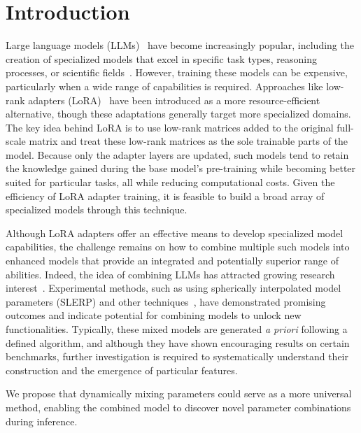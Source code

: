 \section{Introduction}
Large language models (LLMs)~\cite{Vaswani2017AttentionNeedc,Touvron2023LlamaModels,OpenAI2023GPT-4Report,Chowdhery2022PaLM:Pathways,Jiang2023Mistral7B,Gunasekar2023TextbooksNeed} have become increasingly popular, including the creation of specialized models that excel in specific task types, reasoning processes, or scientific fields~\cite{Bubeck2023SparksGPT-4,Buehler2023MechGPTModalities,Nejjar2023LLMsAnalysis,Buehler2023GenerativeDesign,Luu2023BioinspiredLLM:Materials,Luu2023GenerativeSolvents,Buehler2023MeLMProblemsb,Ge2023OpenAGI:Experts}. However, training these models can be expensive, particularly when a wide range of capabilities is required. Approaches like low-rank adapters (LoRA)~\cite{hu2021lora} have been introduced as a more resource-efficient alternative, though these adaptations generally target more specialized domains. The key idea behind LoRA is to use low-rank matrices added to the original full-scale matrix and treat these low-rank matrices as the sole trainable parts of the model. Because only the adapter layers are updated, such models tend to retain the knowledge gained during the base model’s pre-training while becoming better suited for particular tasks, all while reducing computational costs. Given the efficiency of LoRA adapter training, it is feasible to build a broad array of specialized models through this technique.

Although LoRA adapters offer an effective means to develop specialized model capabilities, the challenge remains on how to combine multiple such models into enhanced models that provide an integrated and potentially superior range of abilities. Indeed, the idea of combining LLMs has attracted growing research interest~\cite{Kim2023SOLARUp-Scaling}. Experimental methods, such as using spherically interpolated model parameters (SLERP) and other techniques~\cite{Arcee-ai/mergekit:Models.}, have demonstrated promising outcomes and indicate potential for combining models to unlock new functionalities. Typically, these mixed models are generated {\it a priori} following a defined algorithm, and although they have shown encouraging results on certain benchmarks, further investigation is required to systematically understand their construction and the emergence of particular features.

We propose that dynamically mixing parameters could serve as a more universal method, enabling the combined model to discover novel parameter combinations during inference.

